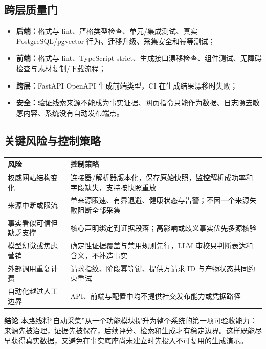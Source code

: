 \documentclass[UTF8,11pt,a4paper,fontset=none]{ctexart}
\begin{document}
\subsection{跨层质量门}

\begin{itemize}[leftmargin=2em,itemsep=0.25em]
  \item \textbf{后端：}格式与 lint、严格类型检查、单元/集成测试、真实 PostgreSQL/pgvector 行为、迁移升级、采集安全和幂等测试；
  \item \textbf{前端：}格式与 lint、TypeScript strict、生成接口漂移检查、组件测试、无障碍检查与素材复制/下载流程；
  \item \textbf{跨层：}FastAPI OpenAPI 生成前端类型，CI 在生成结果漂移时失败；
  \item \textbf{安全：}验证线索来源不能成为事实证据、网页指令只能作为数据、日志隐去敏感内容、系统没有自动发布端点。
\end{itemize}

\subsection{关键风险与控制策略}

\noindent\begin{tabularx}{\textwidth}{L{3.25cm}Y}
\toprule
{}
\color{white}\bfseries\sffamily 风险 &
\color{white}\bfseries\sffamily 控制策略 \\
\midrule
权威网站结构变化 & 连接器/解析器版本化，保存原始快照，监控解析成功率和字段缺失，支持按快照重放 \\
来源中断或限流 & 单来源限速、有界退避、健康状态与告警；不因一个来源失败阻断全部采集 \\
事实看似可信但缺乏支撑 & 核心声明绑定到证据段落；高影响或歧义事实优先多源核验 \\
模型幻觉或焦虑营销 & 确定性证据覆盖与禁用规则先行，LLM 审校只判断表达和含义，不补造事实 \\
外部调用重复计费 & 请求指纹、阶段幂等键、提供方请求 ID 与产物状态共同约束重试 \\
自动化越过人工边界 & API、前端与配置中均不提供社交发布能力或凭据路径 \\
\bottomrule
\end{tabularx}

\begin{focusbox}
\textbf{\sffamily\color{navy}结论}\quad
本路线将“自动采集”从一个功能模块提升为整个系统的第一项可验收能力：来源先被治理，证据先被保存，后续评分、检索和生成才有稳定边界。这样既能尽早获得真实数据，又避免在事实底座尚未建立时先投入不可复用的生成演示。
\end{focusbox}
\end{document}
